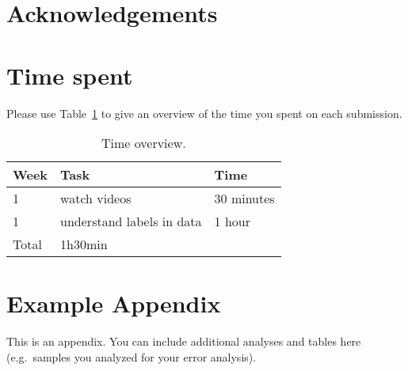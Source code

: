 \documentclass[11pt]{article}
\begin{document}
\section*{Acknowledgements}





\appendix

\section{Time spent}\label{app.time}

Please use Table~\ref{time} to give an overview of the time you spent on each submission. 

\begin{table}[!htb]
\centering
\small{
\begin{tabular}{p{1cm}p{3cm}p{1cm}}
\toprule
  Week &    Task &  Time \\
\midrule
 1 &   watch videos         &      30 minutes \\
 1 &   understand labels in data       &      1 hour         \\ \midrule
    Total   &     1h30min \\ 
            
\bottomrule
\end{tabular}
\caption{Time overview. \label{time} }}
\end{table}

\section{Example Appendix}
\label{sec:appendix}

This is an appendix. You can include additional analyses and tables here (e.g.\ samples you analyzed for your error analysis). 
\end{document}
